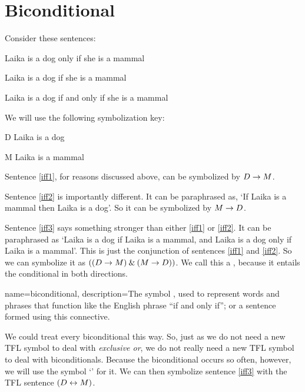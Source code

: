\section{Biconditional}
Consider these sentences:
	\begin{earg}
		\item[\ex{iff1}] Laika is a dog only if she is a mammal
		\item[\ex{iff2}] Laika is a dog if she is a mammal
		\item[\ex{iff3}] Laika is a dog if and only if she is a mammal
	\end{earg}
We will use the following symbolization key:
	\begin{ekey}
		\item[D] Laika is a dog
		\item[M] Laika is a mammal
	\end{ekey}
Sentence \ref{iff1}, for reasons discussed above, can be symbolized by $D \rightarrow M$.

Sentence \ref{iff2} is importantly different. It can be paraphrased as, `If Laika is a mammal then Laika is a dog'. So it can be symbolized by $M \rightarrow D$.

Sentence \ref{iff3} says something stronger than either \ref{iff1} or \ref{iff2}. It can be paraphrased as `Laika is a dog if Laika is a mammal, and Laika is a dog only if Laika is a mammal'. This is just the conjunction of sentences \ref{iff1} and \ref{iff2}. So we can symbolize it as $((D \rightarrow M) \mathbin{\&} (M \rightarrow D))$. We call this a , because it entails the conditional in both directions.

{
name=biconditional,
description={The symbol \eiff, used to represent words and phrases that function like the English phrase ``if and only if''; or a sentence formed using this connective.}
}

We could treat every biconditional this way. So, just as we do not need a new TFL symbol to deal with \emph{exclusive or}, we do not really need a new TFL symbol to deal with biconditionals. Because the biconditional occurs so often, however, we will use the symbol `\eiff' for it. We can then symbolize sentence \ref{iff3} with the TFL sentence $(D \leftrightarrow M)$.

